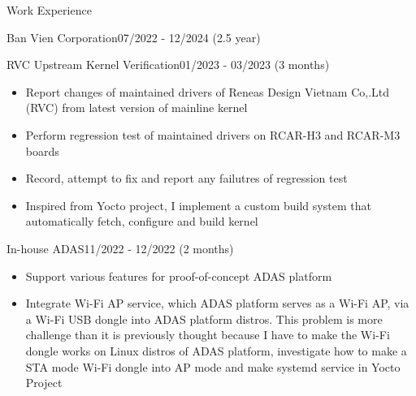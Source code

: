 \documentclass{resume} %
\begin{document}
\begin{rSection}{Work Experience}
\begin{rCompanySubsection}{Ban Vien Corporation}{07/2022 - 12/2024 (2.5 year)}
        \begin{rProjectSubsubsectionV2}{RVC Upstream Kernel Verification}{01/2023 - 03/2023 (3 months)} {
            \begin{itemize}
                \item Report changes of maintained drivers of Reneas Design Vietnam Co,.Ltd (RVC) from latest version of mainline kernel
                \item Perform regression test of maintained drivers on RCAR-H3 and RCAR-M3 boards
                \item Record, attempt to fix and report any failutres of regression test
            \end{itemize}
        }{
            \begin{itemize}
                \item Inspired from Yocto project, I implement a custom build system that automatically fetch, configure and build kernel
            \end{itemize}
        }
        \end{rProjectSubsubsectionV2}

        \begin{rProjectSubsubsectionV2}{In-house ADAS}{11/2022 - 12/2022 (2 months)} {
            \begin{itemize}
                \item Support various features for proof-of-concept ADAS platform
            \end{itemize}
        }{
            \begin{itemize}
                \item Integrate Wi-Fi AP service, which ADAS platform serves as a Wi-Fi AP, via a Wi-Fi USB dongle into ADAS platform distros. This problem is more challenge than it is previously thought because I have to make the Wi-Fi dongle works on Linux distros of ADAS platform, investigate how to make a STA mode Wi-Fi dongle into AP mode and make systemd service in Yocto Project
            \end{itemize}
        }
        \end{rProjectSubsubsectionV2}


\end{rCompanySubsection}
\end{rSection}
\end{document}
